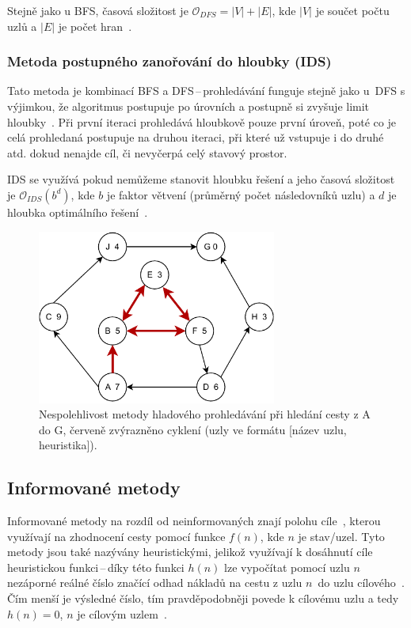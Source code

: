 Stejně jako u BFS, časová složitost je \(\mathcal{O}_{DFS} = |V| + |E|\), kde \(|V|\) je součet počtu uzlů a \(|E|\) je počet hran~\cite{CS225BFSDFS}.

\subsubsection*{\textbullet Metoda postupného zanořování do hloubky (IDS)}
Tato metoda je kombinací BFS a DFS\,--\,prohledávání funguje stejně jako u~DFS s výjimkou, že algoritmus postupuje po úrovních a postupně si zvyšuje limit hloubky~\cite{poole2023artificial}. Při první iteraci prohledává hloubkově pouze první úroveň, poté co je celá prohledaná postupuje na druhou iteraci, při které už vstupuje i do druhé atd. dokud nenajde cíl, či nevyčerpá celý stavový prostor. 

IDS se využívá pokud nemůžeme stanovit hloubku řešení a jeho časová složitost je \(\mathcal{O}_{IDS}(b^{d})\), kde \(b\) je faktor větvení (průměrný počet následovníků uzlu) a \(d\) je hloubka optimálního řešení~\cite{izu}.

\begin{figure}[H]
    \centering
    \includegraphics[width=0.7\textwidth]{obrazky-figures/ch2/GreedySearch.pdf}
    \caption{Nespolehlivost metody hladového prohledávání při hledání cesty z A do G, červeně zvýrazněno cyklení (uzly ve formátu [název uzlu, heuristika]).~\cite{poole2023artificial}}
    \label{fig:GreedySearch}
\end{figure}

\subsection*{Informované metody}
Informované metody na rozdíl od neinformovaných znají polohu cíle~\cite{izu}, kterou využívají na zhodnocení cesty pomocí funkce  ${f(n)}$, kde ${n}$ je stav/uzel. Tyto metody jsou také nazývány heuristickými, jelikož využívají k dosáhnutí cíle heuristickou funkci\,--\,díky této funkci ${h(n)}$ lze vypočítat pomocí uzlu ${n}$ nezáporné reálné číslo značící odhad nákladů na cestu z uzlu ${n}$~do uzlu cílového~\cite{poole2023artificial}. Čím menší je výsledné číslo, tím pravděpodobněji povede k cílovému uzlu a tedy ${h(n) = 0}$, ${n}$ je cílovým uzlem~\cite{AI-Modern_approach}.

